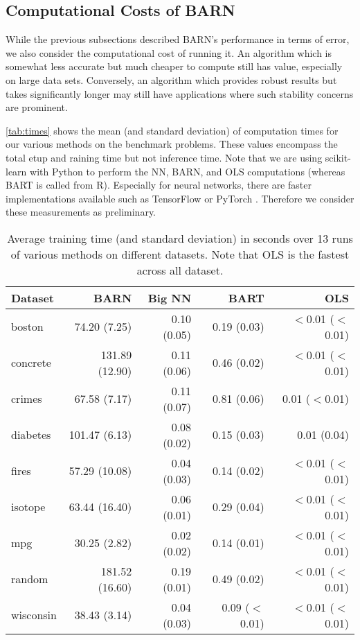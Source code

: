 \documentclass[12pt]{article}
\begin{document}
\subsection{Computational Costs of BARN}\label{subsec:cost}

While the previous subsections described BARN's performance in terms of error, we also consider the computational cost of running it.  An algorithm which is somewhat less accurate but much cheaper to compute still has value, especially on large data sets.  Conversely, an algorithm which provides robust results but takes significantly longer may still have applications where such stability concerns are prominent.

\autoref{tab:times} shows the mean (and standard deviation) of computation times for our various methods on the benchmark problems.  These values encompass the total etup and raining time but not inference time.  Note that we are using scikit-learn \cite{scikit-learn} with Python to perform the NN, BARN, and OLS computations (whereas BART is called from R).  Especially for neural networks, there are faster implementations available such as TensorFlow \cite{tensorflow2015whitepaper} or PyTorch \cite{paszke2019pytorch}.   Therefore we consider these measurements as preliminary.  

\begin{table}[htb]
\centering
\caption{Average training time (and standard deviation) in seconds over 13 runs of various methods on different datasets.  Note that OLS is the fastest across all dataset.}
\begin{tabular}{lrrrr}
Dataset   &     BARN &    Big NN &      BART & OLS\\ \hline
boston     & 74.20 (7.25)  & 0.10 (0.05)&  0.19 (0.03)  & $<$0.01 ($<$0.01) \\
concrete  & 131.89 (12.90)  & 0.11 (0.06)&  0.46 (0.02)  & $<$0.01 ($<$0.01) \\
crimes     & 67.58 (7.17)  & 0.11 (0.07)&  0.81 (0.06)  & 0.01 ($<$0.01) \\
diabetes  & 101.47 (6.13)  & 0.08 (0.02)&  0.15 (0.03)  & 0.01 (0.04) \\
fires      & 57.29 (10.08)  & 0.04 (0.03)&  0.14 (0.02)  & $<$0.01 ($<$0.01) \\
isotope    & 63.44 (16.40)  & 0.06 (0.01)&  0.29 (0.04)  & $<$0.01 ($<$0.01) \\
mpg        & 30.25 (2.82)  & 0.02 (0.02)&  0.14 (0.01)  & $<$0.01 ($<$0.01) \\
random    & 181.52 (16.60)  & 0.19 (0.01)&  0.49 (0.02)  & $<$0.01 ($<$0.01) \\
wisconsin  & 38.43 (3.14)  & 0.04 (0.03)&  0.09 ($<$0.01)  & $<$0.01 ($<$0.01) \\
\end{tabular}
    \label{tab:times}
\end{table}
\end{document}
